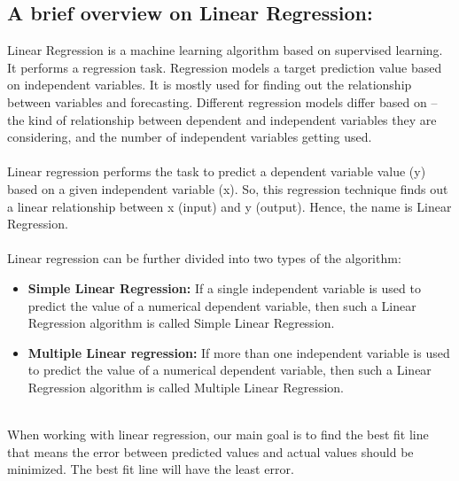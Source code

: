 \documentclass[12pt,a4paper]{article}
\begin{document}
\subsection{A brief overview on Linear Regression:}
Linear Regression is a machine learning algorithm based on supervised learning. It performs a regression task. Regression models a target prediction value based on independent variables. It is mostly used for finding out the relationship between variables and forecasting. Different regression models differ based on – the kind of relationship between dependent and independent variables they are considering, and the number of independent variables getting used.\\
\\Linear regression performs the task to predict a dependent variable value (y) based on a given independent variable (x). So, this regression technique finds out a linear relationship between x (input) and y (output). Hence, the name is Linear Regression.\\
\\Linear regression can be further divided into two types of the algorithm:
\begin{itemize}
\item \textbf{Simple Linear Regression:} If a single independent variable is used to predict the value of a numerical dependent variable, then such a Linear Regression algorithm is called Simple Linear Regression.
\item \textbf{Multiple Linear regression:} If more than one independent variable is used to predict the value of a numerical dependent variable, then such a Linear Regression algorithm is called Multiple Linear Regression.
\end{itemize}
\\When working with linear regression, our main goal is to find the best fit line that means the error between predicted values and actual values should be minimized. The best fit line will have the least error.
\end{document}
